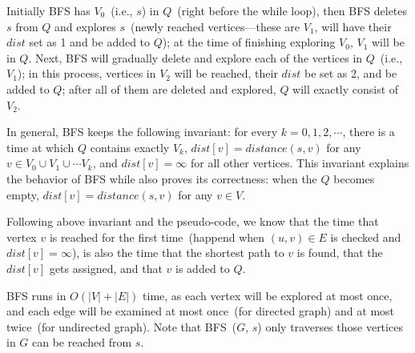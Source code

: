 


Initially BFS has $V_0$~(i.e., $s$) in $Q$~(right before the while loop), 
then BFS deletes $s$ from $Q$ and explores $s$~(newly reached vertices---these are $V_1$, will have their $dist$ set as 1 and be added to $Q$);
at the time of finishing exploring $V_0$, $V_1$ will be in $Q$. 
Next, BFS will gradually delete and explore each of the vertices in $Q$~(i.e., $V_1$);
in this process, vertices in $V_2$ will be reached, their $dist$ be set as 2, and be added to $Q$;
after all of them are deleted and explored, $Q$ will exactly consist of $V_2$.

In general, BFS keeps the following invariant: for every $k = 0, 1, 2, \cdots$, 
there is a time at which $Q$ contains exactly $V_k$, $dist[v] = distance(s, v)$ for any $v\in V_0\cup V_1\cup \cdots V_k$,
and $dist[v] = \infty$ for all other vertices.
This invariant explains the behavior of BFS while also proves its correctness:
when the $Q$ becomes empty, $dist[v] = distance(s, v)$ for any $v\in V$.

Following above invariant and the pseudo-code, we know that the time that vertex $v$ is reached for the first time~(happend when $(u,v)\in E$ is checked and $dist[v] = \infty$),
is also the time that the shortest path to $v$ is found, that the $dist[v]$ gets assigned, and that $v$ is added to $Q$.

\begin{minipage}{0.8\textwidth}
	\xxx
	\xxx
	\xxx
	\xxx
	\xxx
	\xxx
	\xxx
	\xxx
	\xxx
	\xxx
	\xxx
	\xxx
	\xxx
	\xxx
	\xxx
	\xxx
\end{minipage}



BFS runs in $O(|V| + |E|)$ time, as each vertex will be explored at most once, and each 
edge will be examined at most once~(for directed graph) and at most twice~(for undirected graph).
Note that BFS~($G$, $s$) only traverses those vertices in $G$ can be reached from $s$.


